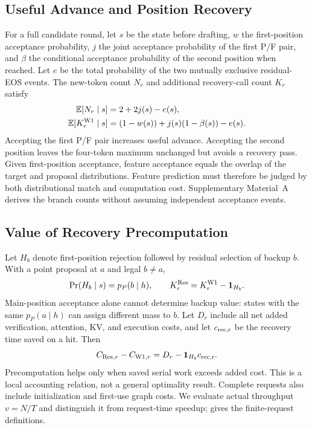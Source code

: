 \subsection{Useful Advance and Position Recovery}
For a full candidate round, let $s$ be the state before drafting, $w$ the first-position acceptance probability, $j$ the joint acceptance probability of the first P/F pair, and $\beta$ the conditional acceptance probability of the second position when reached. Let $e$ be the total probability of the two mutually exclusive residual-EOS events. The new-token count $N_r$ and additional recovery-call count $K_r$ satisfy
\begin{align}
\mathbb{E}[N_r\mid s]&=2+2j(s)-e(s),\label{eq:advance}\\
\mathbb{E}[K_r^{\mathrm{W1}}\mid s]&=(1-w(s))+j(s)(1-\beta(s))-e(s).
\label{eq:recover}
\end{align}
Accepting the first P/F pair increases useful advance. Accepting the second position leaves the four-token maximum unchanged but avoids a recovery pass. Given first-position acceptance, feature acceptance equals the overlap of the target and proposal distributions. Feature prediction must therefore be judged by both distributional match and computation cost. Supplementary Material~A derives the branch counts without assuming independent acceptance events.

\subsection{Value of Recovery Precomputation}
Let $H_b$ denote first-position rejection followed by residual selection of backup $b$. With a point proposal at $a$ and legal $b\ne a$,
\begin{equation}
\Pr(H_b\mid s)=p_P(b\mid h),\qquad
K_r^{\mathrm{Res}}=K_r^{\mathrm{W1}}-\mathbf{1}_{H_b}.
\label{eq:hit}
\end{equation}
Main-position acceptance alone cannot determine backup value: states with the same $p_P(a\mid h)$ can assign different mass to $b$.
Let $D_r$ include all net added verification, attention, KV, and execution costs, and let $c_{\rm rec,r}$ be the recovery time saved on a hit. Then
\begin{equation}
C_{\mathrm{Res},r}-C_{\mathrm{W1},r}=D_r-\mathbf{1}_{H_b}c_{\rm rec,r}.
\label{eq:cost}
\end{equation}
Precomputation helps only when saved serial work exceeds added cost. This is a local accounting relation, not a general optimality result. Complete requests also include initialization and first-use graph costs. We evaluate actual throughput $v=N/T$ and distinguish it from request-time speedup;  gives the finite-request definitions.
